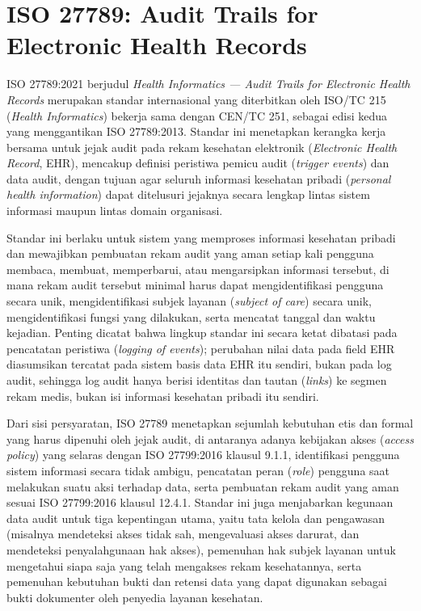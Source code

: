 \section{ISO 27789: Audit Trails for Electronic Health Records}
\label{sec:iso27789}

ISO 27789:2021 berjudul \textit{Health Informatics --- Audit Trails for Electronic Health Records} merupakan standar internasional yang diterbitkan oleh ISO/TC 215 (\textit{Health Informatics}) bekerja sama dengan CEN/TC 251, sebagai edisi kedua yang menggantikan ISO 27789:2013. Standar ini menetapkan kerangka kerja bersama untuk jejak audit pada rekam kesehatan elektronik (\textit{Electronic Health Record}, EHR), mencakup definisi peristiwa pemicu audit (\textit{trigger events}) dan data audit, dengan tujuan agar seluruh informasi kesehatan pribadi (\textit{personal health information}) dapat ditelusuri jejaknya secara lengkap lintas sistem informasi maupun lintas domain organisasi. 

Standar ini berlaku untuk sistem yang memproses informasi kesehatan pribadi dan mewajibkan pembuatan rekam audit yang aman setiap kali pengguna membaca, membuat, memperbarui, atau mengarsipkan informasi tersebut, di mana rekam audit tersebut minimal harus dapat mengidentifikasi pengguna secara unik, mengidentifikasi subjek layanan (\textit{subject of care}) secara unik, mengidentifikasi fungsi yang dilakukan, serta mencatat tanggal dan waktu kejadian. Penting dicatat bahwa lingkup standar ini secara ketat dibatasi pada pencatatan peristiwa (\textit{logging of events}); perubahan nilai data pada field EHR diasumsikan tercatat pada sistem basis data EHR itu sendiri, bukan pada log audit, sehingga log audit hanya berisi identitas dan tautan (\textit{links}) ke segmen rekam medis, bukan isi informasi kesehatan pribadi itu sendiri.

Dari sisi persyaratan, ISO 27789 menetapkan sejumlah kebutuhan etis dan formal yang harus dipenuhi oleh jejak audit, di antaranya adanya kebijakan akses (\textit{access policy}) yang selaras dengan ISO 27799:2016 klausul 9.1.1, identifikasi pengguna sistem informasi secara tidak ambigu, pencatatan peran (\textit{role}) pengguna saat melakukan suatu aksi terhadap data, serta pembuatan rekam audit yang aman sesuai ISO 27799:2016 klausul 12.4.1. Standar ini juga menjabarkan kegunaan data audit untuk tiga kepentingan utama, yaitu tata kelola dan pengawasan (misalnya mendeteksi akses tidak sah, mengevaluasi akses darurat, dan mendeteksi penyalahgunaan hak akses), pemenuhan hak subjek layanan untuk mengetahui siapa saja yang telah mengakses rekam kesehatannya, serta pemenuhan kebutuhan bukti dan retensi data yang dapat digunakan sebagai bukti dokumenter oleh penyedia layanan kesehatan.

